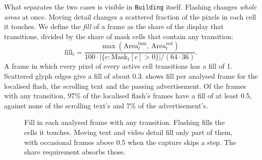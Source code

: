 \documentclass[11pt,a4paper]{article}
\newcommand{\code}[1]{\texttt{#1}}
\begin{document}
What separates the two cases is visible in \code{Building} itself. Flashing changes \emph{whole areas} at once. Moving detail changes a scattered fraction of the pixels in each cell it touches. We define the \emph{fill} of a frame as the share of the display that transitions, divided by the share of mask cells that contain any transition:
\begin{equation}
  \text{fill}_t = \frac{\max(\text{Area}^{\text{lum}}_t,\, \text{Area}^{\text{red}}_t)}{100\cdot|\{c : \text{Mask}_t[c] > 0\}| / (64\cdot 36)} .
\end{equation}
A frame in which every pixel of every active cell transitions has a fill of 1. Scattered glyph edges give a fill of about 0.3.  shows fill per analysed frame for the localised flash, the scrolling text and the passing advertisement. Of the frames with any transition, 97\% of the localised flash's frames have a fill of at least 0.5, against none of the scrolling text's and 7\% of the advertisement's.

\scrollticks
{}\adticks
\begin{figure}[ht]
  \centering
  \caption{Fill in each analysed frame with any transition. Flashing fills the cells it touches. Moving text and video detail fill only part of them, with occasional frames above 0.5 when the capture skips a step. The share requirement absorbs those.}
  \label{fig:fill}
\end{figure}
\end{document}
